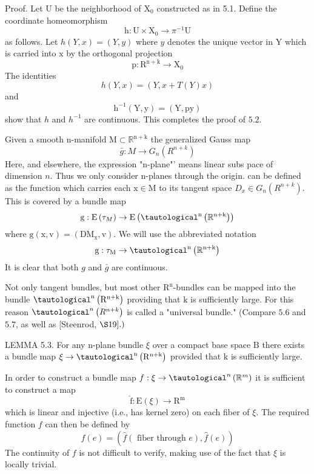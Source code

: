 \documentclass[10pt]{article}
\begin{document}
Proof. Let $\mathrm{U}$ be the neighborhood of $\mathrm{X}_{0}$ constructed as in 5.1. Define the coordinate homeomorphism
$$
\mathrm{h}: \mathrm{U} \times \mathrm{X}_{0} \rightarrow \pi^{-1} \mathrm{U}
$$
as follows. Let $h(Y, x)=(Y, y)$ where $y$ denotes the unique vector in $\mathrm{Y}$ which is carried into $\mathrm{x}$ by the orthogonal projection
$$
\mathrm{p}: \mathrm{R}^{\mathrm{n}+\mathrm{k}} \rightarrow \mathrm{X}_{0}
$$
The identities
$$
h(Y, x)=(Y, x+T(Y) x)
$$
and
$$
\mathrm{h}^{-1}(\mathrm{Y}, \mathrm{y})=(\mathrm{Y}, \mathrm{py})
$$
show that $h$ and $h^{-1}$ are continuous. This completes the proof of $5.2$.

Given a smooth $\mathrm{n}$-manifold $\mathrm{M} \subset \mathbb{R}^{\mathrm{n}+\mathrm{k}}$ the generalized Gauss map
$$
\bar{g}: M \rightarrow G_{n}\left(R^{n+k}\right)
$$
Here, and elsewhere, the expression "n-plane"' means linear subs pace of dimension $n$. Thus we only consider n-planes through the origin. can be defined as the function which carries each $\mathrm{x} \in \mathrm{M}$ to its tangent space $D_{x} \in G_{n}\left(R^{n+k}\right)$. This is covered by a bundle map
$$
\mathrm{g}: \mathrm{E}\left(\tau_{M}\right) \rightarrow \mathrm{E}\left(\tautological^{\mathrm{n}}\left(\mathbb{R}^{\mathrm{n}+\mathrm{k}}\right)\right)
$$
where $\mathrm{g}(\mathrm{x}, \mathrm{v})=\left(\mathrm{DM}_{\mathrm{x}}, \mathrm{v}\right)$. We will use the abbreviated notation
$$
\mathrm{g}: \tau_{\mathrm{M}} \rightarrow \tautological^{\mathrm{n}}\left(\mathbb{R}^{\mathrm{n}+\mathrm{k}}\right)
$$
It is clear that both $g$ and $\bar{g}$ are continuous.

Not only tangent bundles, but most other $\mathrm{R}^{\mathrm{n}}$-bundles can be mapped into the bundle $\tautological^{\mathrm{n}}\left(\mathrm{R}^{\mathrm{n}+\mathrm{k}}\right)$ providing that $\mathrm{k}$ is sufficiently large. For this reason $\tautological^{n}\left(R^{n+k}\right)$ is called a "universal bundle." (Compare $5.6$ and $5.7$, as well as [Steenrod, $\S 19] .)$

LEMMA 5.3. For any n-plane bundle $\xi$ over a compact base space $\mathrm{B}$ there exists a bundle map $\xi \rightarrow \tautological^{\mathrm{n}}\left(\mathrm{R}^{\mathrm{n}+\mathrm{k}}\right)$ provided that $\mathrm{k}$ is sufficiently large.

In order to construct a bundle map $f: \xi \rightarrow \tautological^{n}\left(\mathbb{R}^{m}\right)$ it is sufficient to construct a map
$$
\hat{\mathrm{f}}: \mathrm{E}(\xi) \rightarrow \mathrm{R}^{\mathrm{m}}
$$
which is linear and injective (i.e., has kernel zero) on each fiber of $\xi$. The required function $f$ can then be defined by
$$
f(e)=(\widehat{f}(\text { fiber through } e), \widehat{f}(e))
$$
The continuity of $f$ is not difficult to verify, making use of the fact that $\xi$ is locally trivial.
\end{document}
